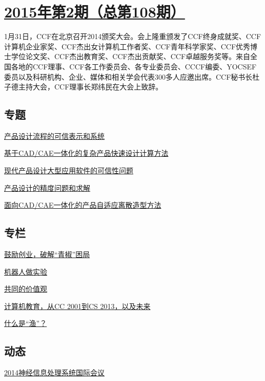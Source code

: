 \documentclass[a4paper]{article}
\begin{document}
\section{\href{http://history.ccf.org.cn/sites/ccf/jsjtbbd.jsp?contentId=2845154181957}{\textbf{2015年第2期（总第108期）}}}
1月31日，CCF在北京召开2014颁奖大会。会上隆重颁发了CCF终身成就奖、CCF计算机企业家奖、CCF杰出女计算机工作者奖、CCF青年科学家奖、CCF优秀博士学位论文奖、CCF杰出教育奖、CCF杰出贡献奖、CCF卓越服务奖等。来自全国各地的CCF理事、CCF各工作委员会、各专业委员会、CCCF编委、YOCSEF委员以及科研机构、企业、媒体和相关学会代表300多人应邀出席。CCF秘书长杜子德主持大会，CCF理事长郑纬民在大会上致辞。
\subsection{专题}
\href{http://history.ccf.org.cn/resources/1190201776262/2015/02/12/5.pdf}{产品设计流程的可信表示和系统}

\href{http://history.ccf.org.cn/resources/1190201776262/2015/02/12/6.pdf}{基于CAD/CAE一体化的复杂产品快速设计计算方法}

\href{http://history.ccf.org.cn/resources/1190201776262/2015/02/12/2.pdf}{现代产品设计大型应用软件的可信性问题}

\href{http://history.ccf.org.cn/resources/1190201776262/2015/02/12/3.pdf}{产品设计的精度问题和求解}

\href{http://history.ccf.org.cn/resources/1190201776262/2015/02/12/4.pdf}{面向CAD/CAE一体化的产品自适应离散造型方法}

\subsection{专栏}
\href{http://history.ccf.org.cn/resources/1190201776262/2015/02/12/8.pdf}{鼓励创业，破解“青椒”困局}

\href{http://history.ccf.org.cn/resources/1190201776262/2015/02/12/9.pdf}{机器人做实验}

\href{http://history.ccf.org.cn/resources/1190201776262/2015/02/12/11.pdf}{共同的价值观}

\href{http://history.ccf.org.cn/resources/1190201776262/2015/02/12/7.pdf}{计算机教育，从CC 2001到CS 2013，以及未来}

\href{http://history.ccf.org.cn/resources/1190201776262/2015/02/12/10.pdf}{什么是“渔”？}

\subsection{动态}
\href{http://history.ccf.org.cn/resources/1190201776262/2015/02/12/12.pdf}{2014神经信息处理系统国际会议}
\end{document}
